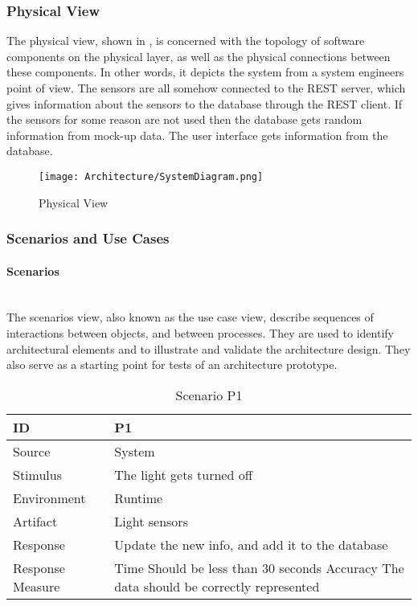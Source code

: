 \documentclass[../document.tex]{subfiles}
\begin{document}
\subsubsection{Physical View}
The physical view, shown in , is concerned with the topology of software components on the physical layer, as well as the physical connections between these components. In other words, it depicts the system from a system engineers point of view. The sensors are all somehow connected to the REST server, which gives information about the sensors to the database through the REST client. If the sensors for some reason are not used then the database gets random information from mock-up data. The user interface gets information from the database.

\begin{figure}[H]
	\centering
	\texttt{[image: Architecture/SystemDiagram.png]}
	\caption{Physical View}
	\label{fig:SystemDiagram}
\end{figure}

\subsubsection{Scenarios and Use Cases}
\paragraph{Scenarios} \ \\
The scenarios view, also known as the use case view, describe sequences of interactions between objects, and between processes. They are used to identify architectural elements and to illustrate and validate the architecture design. They also serve as a starting point for tests of an architecture prototype.

\begin{table}[H]
	\caption{Scenario P1}
	\begin{tabularx}{\textwidth}{|X|X|}
		\hline
		ID					& P1 \\ \hline
		Source				& System \\ \hline
		Stimulus			& The light gets turned off \\ \hline
		Environment			& Runtime \\ \hline
		Artifact			& Light sensors \\ \hline
		Response			& Update the new info, and add it to the database \\ \hline
		Response Measure	& Time \newline Should be less than 30 seconds \newline Accuracy \newline The data should be correctly represented
		\\ \hline
	\end{tabularx}
\end{table}
\end{document}
